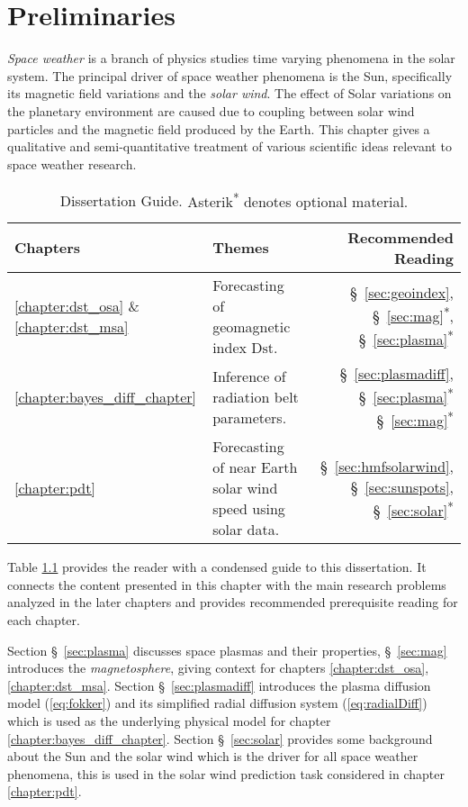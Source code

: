 \chapter{Preliminaries}\label{chapter:preliminaries}

\emph{Space weather} is a branch of physics studies time varying phenomena in the solar system. The principal 
driver of space weather phenomena is the Sun, specifically its magnetic field variations and the \emph{solar wind}.
The effect of Solar variations on the planetary environment are caused due to coupling between solar wind particles 
and the magnetic field produced by the Earth. This chapter gives a qualitative and semi-quantitative treatment of 
various scientific ideas relevant to space weather research.

\begin{table}
    \centering
    \begin{tabular}{l p{} r}
        \hline
        \textbf{Chapters} & \textbf{Themes} & \textbf{Recommended Reading}\\
        \hline
        \vspace{5pt}
        \ref{chapter:dst_osa} \& \ref{chapter:dst_msa} & Forecasting of geomagnetic index $\mathrm{Dst}$. & \S~\ref{sec:geoindex}, \S~\ref{sec:mag}\textsuperscript{*}, \S~\ref{sec:plasma}\textsuperscript{*} \\
        \ref{chapter:bayes_diff_chapter} & Inference of radiation belt parameters. & \S~\ref{sec:plasmadiff}, \S~\ref{sec:plasma}\textsuperscript{*} \S~\ref{sec:mag}\textsuperscript{*} \\
        \ref{chapter:pdt} & Forecasting of near Earth solar wind speed using solar data. & \S~\ref{sec:hmfsolarwind}, \S~\ref{sec:sunspots}, \S~\ref{sec:solar}\textsuperscript{*}\\
        \hline
    \end{tabular}
    \caption{Dissertation Guide. {\small Asterik\textsuperscript{*} denotes optional material.}}
    \label{table:chapterguide}
\end{table}

Table \ref{table:chapterguide} provides the reader with a condensed guide to this dissertation. 
It connects the content presented in this chapter with the main research problems analyzed in the later chapters 
and provides recommended prerequisite reading for each chapter.

Section \S~\ref{sec:plasma} discusses space plasmas and their properties, \S~\ref{sec:mag} introduces the 
\emph{magnetosphere}, giving context for chapters \ref{chapter:dst_osa},\ref{chapter:dst_msa}. 
Section \S~\ref{sec:plasmadiff} introduces the plasma diffusion model (\cref{eq:fokker}) and its simplified 
radial diffusion system (\cref{eq:radialDiff}) which is used as the underlying physical model for chapter 
\ref{chapter:bayes_diff_chapter}. Section \S~\ref{sec:solar} provides some background about the Sun and 
the solar wind which is the driver for all space weather phenomena, this is used in the solar wind prediction 
task considered in chapter \ref{chapter:pdt}.    


